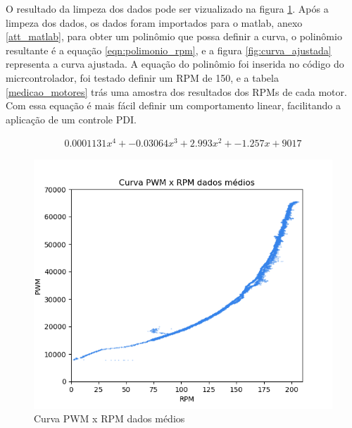 	
	O resultado da limpeza dos dados pode ser vizualizado na figura \ref{fig:medicao_pwm_x_rpm_dados_medios}.
	Após a limpeza dos dados, os dados foram importados para o matlab, anexo \ref{att_matlab},
	para obter um polinômio que possa definir a curva, o polinômio resultante é a equação \ref{eqn:polimonio_rpm}, e a figura \ref{fig:curva_ajustada} representa a curva ajustada.
	A equação do polinômio foi inserida no código do micrcontrolador, foi testado definir um RPM de 150, e a tabela \ref{medicao_motores} trás uma amostra dos resultados dos RPMs de cada motor.
	Com essa equação é mais fácil definir um comportamento linear, facilitando a aplicação de um controle PDI.
	
	\begin{equation}
		\begin{split}
			0.0001131x^{4} + -0.03064x^{3} + 2.993x^{2} + -1.257x + 9017
		\end{split}
		\label{eqn:polimonio_rpm}
	\end{equation}
	
	\begin{figure}[htb]
		\centering
		\includegraphics{figures/curva_pwm_x_rpm_dados_medios}
		\caption{Curva PWM x RPM dados médios}
		\label{fig:medicao_pwm_x_rpm_dados_medios}
	\end{figure}
	
